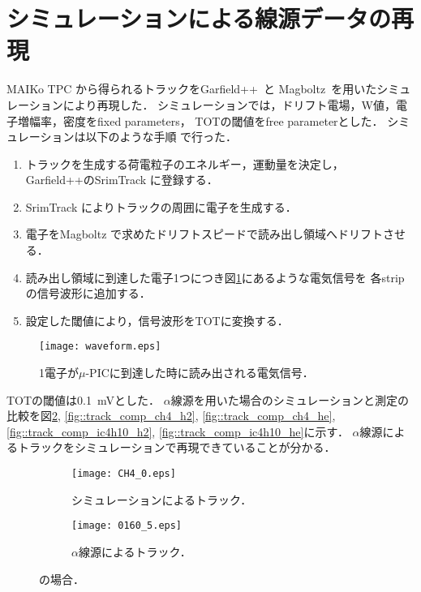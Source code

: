 \documentclass[../master]{subfiles}
\begin{document}
\section{シミュレーションによる線源データの再現}
MAIKo TPC から得られるトラックをGarfield++~\cite{garfield++}と
Magboltz~\cite{magboltz}を用いたシミュレーションにより再現した．
シミュレーションでは，ドリフト電場，W値，電子増幅率，密度をfixed parameters，
TOTの閾値をfree parameterとした．
シミュレーションは以下のような手順%
で行った．
\begin{enumerate}
\item\label{sim::particle_generate}
  トラックを生成する荷電粒子のエネルギー，運動量を決定し，
  Garfield++のSrimTrack に登録する．
\item
  SrimTrack によりトラックの周囲に電子を生成する．
\item
  電子をMagboltz で求めたドリフトスピードで読み出し領域へドリフトさせる．
\item
  読み出し領域に到達した電子1つにつき図\ref{fig::mu-pic_readout}にあるような電気信号を
  各strip の信号波形に追加する．
\item
  設定した閾値により，信号波形をTOTに変換する．
\end{enumerate}
\begin{figure}
  \centering
  \texttt{[image: waveform.eps]}
  \caption{1電子が$\mu$-PICに到達した時に読み出される電気信号．}
  \label{fig::mu-pic_readout}
\end{figure}
TOTの閾値は\SI{0.1}{\milli\volt}とした．
$\alpha$線源を用いた場合のシミュレーションと測定の比較を図\ref{fig::track_comp_ch4},
\ref{fig::track_comp_ch4_h2}, \ref{fig::track_comp_ch4_he}, 
\ref{fig::track_comp_ic4h10_h2}, \ref{fig::track_comp_ic4h10_he}に示す．
$\alpha$線源によるトラックをシミュレーションで再現できていることが分かる．
\begin{figure}
  \centering
  \begin{subfigure}{0.48\columnwidth}
    \centering
    \texttt{[image: CH4\_0.eps]}
    \caption{シミュレーションによるトラック．}
  \end{subfigure}
  \begin{subfigure}{0.48\columnwidth}
    \centering
    \texttt{[image: 0160\_5.eps]}
    \caption{$\alpha$線源によるトラック．}
  \end{subfigure}
  \caption{\Methane の場合．}
  \label{fig::track_comp_ch4}
\end{figure}
\end{document}
